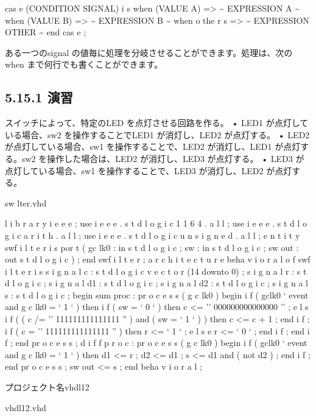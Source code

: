 \documentclass[letterpaper,10pt,dvipdfmx]{sphinxmanual}
\begin{document}
cas e (CONDITION SIGNAL) i s
when (VALUE A) =\textgreater{} \textasciitilde{} EXPRESSION A \textasciitilde{}
when (VALUE B) =\textgreater{} \textasciitilde{} EXPRESSION B \textasciitilde{}
when o the r s =\textgreater{} \textasciitilde{} EXPRESSION OTHER \textasciitilde{}
end cas e ;

ある一つのsignal の値毎に処理を分岐させることができます。処理は、次のwhen まで何行でも書くことができます。


\subsection{5.15.1 演習}
\label{05_try:id24}
スイッチによって、特定のLED を点灯させる回路を作る。
• LED1 が点灯している場合、sw2 を操作することでLED1 が消灯し、LED2 が点灯する。
• LED2 が点灯している場合、sw1 を操作することで、LED2 が消灯し、LED1 が点灯する。sw2 を操作した場合は、LED2 が消灯し、LED3 が点灯する。
• LED3 が点灯している場合、sw1 を操作することで、LED3 が消灯し、LED2 が点灯する。

sw lter.vhd

l i b r a r y i e e e ;
use i e e e . s t d l o g i c 1 1 6 4 . a l l ;
use i e e e . s t d l o g i c a r i t h . a l l ;
use i e e e . s t d l o g i c u n s i g n e d . a l l ;
e n t i t y swf i l t e r i s
por t (
gc lk0 : in s t d l o g i c ;
sw : in s t d l o g i c ;
sw out : out s t d l o g i c
) ;
end swf i l t e r ;
a r c h i t e c t u r e beha v i o r a l o f swf i l t e r i s
s i g n a l c : s t d l o g i c v e c t o r (14 downto 0) ;
s i g n a l r : s t d l o g i c ;
s i g n a l d1 : s t d l o g i c ;
s i g n a l d2 : s t d l o g i c ;
s i g n a l s : s t d l o g i c ;
begin
sum proc : pr o c e s s ( g c lk0 )
begin
i f ( gclk0 ` event and g c lk0 = ` 1 ` ) then
i f ( sw = ` 0 ` ) then
c \textless{}= '' 000000000000000 '' ;
e l s i f ( ( c /= '' 111111111111111 '' ) and ( sw = ` 1 ` ) ) then
c \textless{}= c + 1 ;
end i f ;
i f ( c = '' 111111111111111 '' ) then
r \textless{}= ` 1 ` ;
e l s e
r \textless{}= ` 0 ` ;
end i f ;
end i f ;
end pr o c e s s ;
d i f f p r o c : pr o c e s s ( g c lk0 )
begin
i f ( gclk0 ` event and g c lk0 = ` 1 ` ) then
d1 \textless{}= r ;
d2 \textless{}= d1 ;
s \textless{}= d1 and ( not d2 ) ;
end i f ;
end pr o c e s s ;
sw out \textless{}= s ;
end beha v i o r a l ;

プロジェクト名vhdl12

vhdl12.vhd
\end{document}
